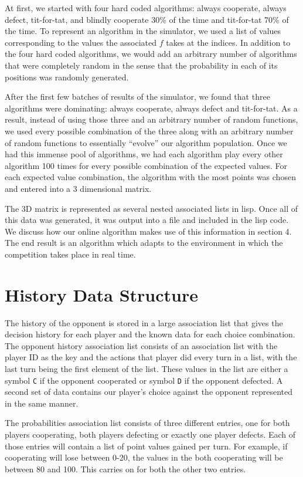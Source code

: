 \documentclass[11pt]{article}
\begin{document}
At first, we started with four hard coded algorithms: always cooperate, always defect, tit-for-tat, and blindly cooperate 30\% of the time and tit-for-tat 70\% of the time. To represent an algorithm in the simulator, we used a list of values corresponding to the values the associated $f$ takes at the indices. In addition to the four hard coded algorithms, we would add an arbitrary number of algorithms that were completely random in the sense that the probability in each of its positions was randomly generated. 

After the first few batches of results of the simulator, we found that three algorithms were dominating: always cooperate, always defect and tit-for-tat. As a result, instead of using those three and an arbitrary number of random functions, we used every possible combination of the three along with an arbitrary number of random functions to essentially “evolve” our algorithm population. Once we had this immense pool of algorithms, we had each algorithm play every other algorithm 100 times for every possible combination of the expected values. For each expected value combination, the algorithm with the most points was chosen and entered into a 3 dimensional matrix.

The 3D matrix is represented as several nested associated lists in lisp. Once all of this data was generated, it was output into a file and included in the lisp code. We discuss how our online algorithm makes use of this information in section 4. The end result is an algorithm which adapts to the environment in which the competition takes place in real time. 


\section{History Data Structure}

The history of the opponent is stored in a large association list that gives the decision history for each player and the known data for each choice combination. The opponent history association list consists of an association list with the player ID as the key and the actions that player did every turn in a list, with the last turn being the first element of the list. These values in the list are either a symbol \texttt{C} if the opponent cooperated or symbol \texttt{D} if the opponent defected. A second set of data contains our player's choice against the opponent represented in the same manner.

The probabilities association list consists of three different entries, one for both players cooperating, both players defecting or exactly one player defects. Each of those entries will contain a list of point values gained per turn. For example, if cooperating will lose between 0-20, the values in the both cooperating will be between 80 and 100. This carries on for both the other two entries.
\end{document}
